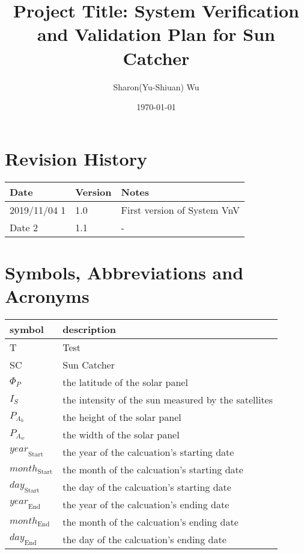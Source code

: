 \documentclass[12pt, titlepage]{article}
\begin{document}
\title{Project Title: System Verification and Validation Plan for Sun Catcher}

\author{Sharon(Yu-Shiuan) Wu} \date{\today} \maketitle
{}

\section{Revision History}

\begin{tabularx}{\textwidth}{p{3cm}p{2cm}X}
\toprule {\bf Date} & {\bf Version} & {\bf Notes}\\ 
\midrule 
2019/11/04 1 & 1.0 & First version of System VnV\\ 
Date 2 & 1.1 & -\\ 
\bottomrule 
\end{tabularx} \newpage
\tableofcontents

\listoftables

\listoffigures

\newpage

\section{Symbols, Abbreviations and Acronyms}

\renewcommand{\arraystretch}{1.2}
\begin{tabular}{l l} \toprule \textbf{symbol} & \textbf{description}\\
 \midrule T & Test\\ 
SC & Sun Catcher\\ 
$\Phi_P$ & the latitude of the solar panel \\ 
$I_{S}$ &  the intensity of the sun measured by the satellites \\ 
$P_{A_{h}}$ & the height of the solar panel \\ 
$P_{A_{w}}$ & the width of the solar panel \\ 
$\mathit{year}_\text{Start}$ & the year of the calcuation's starting date\\ 
$\mathit{month}_\text{Start}$ & the month of the calcuation's starting date\\ 
$\mathit{day}_\text{Start}$ & the day of the calcuation's starting date\\ 
$\mathit{year}_\text{End}$ & the year of the calcuation's ending date\\ 
$\mathit{month}_\text{End}$ & the month of the calcuation's ending date\\ 
$\mathit{day}_\text{End}$ & the day of the calcuation's ending date\\ 
\bottomrule
\end{tabular}\\ 
\end{document}
